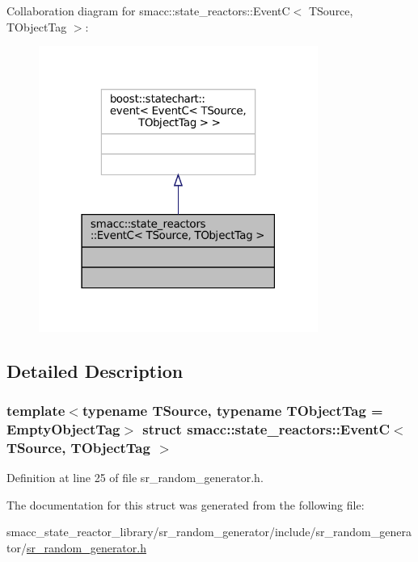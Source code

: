 Collaboration diagram for smacc\+:\+:state\+\_\+reactors\+:\+:EventC$<$ T\+Source, T\+Object\+Tag $>$\+:
\nopagebreak
\begin{figure}[H]
\begin{center}
\leavevmode
\includegraphics[width=259pt]{structsmacc_1_1state__reactors_1_1EventC__coll__graph}
\end{center}
\end{figure}


\subsection{Detailed Description}
\subsubsection*{template$<$typename T\+Source, typename T\+Object\+Tag = Empty\+Object\+Tag$>$\newline
struct smacc\+::state\+\_\+reactors\+::\+Event\+C$<$ T\+Source, T\+Object\+Tag $>$}



Definition at line 25 of file sr\+\_\+random\+\_\+generator.\+h.



The documentation for this struct was generated from the following file\+:\begin{DoxyCompactItemize}
\item 
smacc\+\_\+state\+\_\+reactor\+\_\+library/sr\+\_\+random\+\_\+generator/include/sr\+\_\+random\+\_\+generator/\hyperlink{sr__random__generator_8h}{sr\+\_\+random\+\_\+generator.\+h}\end{DoxyCompactItemize}

